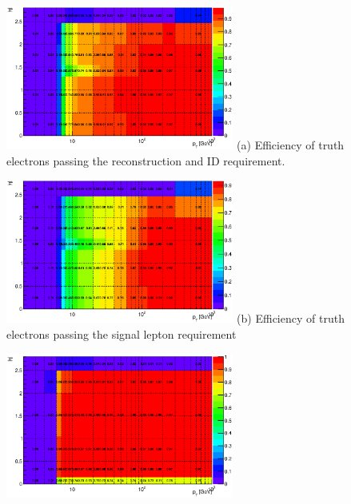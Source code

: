 \begin{figure}
  \begin{center}
    \begin{minipage}[t]{.49\textwidth}
      \centering
      \includegraphics[width=75mm]{figures/BGestimation/ObjReplacement/method/lepeff/el_trPtEta_truthToID.eps}
      \hspace{10mm} (a) Efficiency of truth electrons passing the reconstruction and ID requirement.
      \label{fig::BGestimation::objRep::heff_mc_el_truthToID}
    \end{minipage}
    \begin{minipage}[t]{.49\textwidth}
      \centering
      \includegraphics[width=75mm]{figures/BGestimation/ObjReplacement/method/lepeff/el_trPtEta_truthToSig.eps}
      \hspace{10mm} (b) Efficiency of truth electrons passing the signal lepton requirement
      \label{fig::BGestimation::objRep::heff_mc_el_truthToSig}
    \end{minipage}
    \begin{minipage}[t]{.49\textwidth}
      \centering
      \includegraphics[width=75mm]{figures/BGestimation/ObjReplacement/method/lepeff/mu_trPtEta_truthToID.eps}

\end{minipage}
\end{center}
\end{figure}
